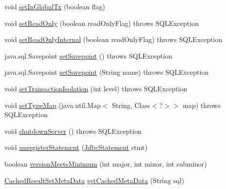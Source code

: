 \begin{DoxyCompactItemize}
\item 
void \mbox{\hyperlink{classcom_1_1mysql_1_1cj_1_1jdbc_1_1_connection_impl_a70a08ce7c0dea524a32a245986fb1531}{set\+In\+Global\+Tx}} (boolean flag)
\item 
void \mbox{\hyperlink{classcom_1_1mysql_1_1cj_1_1jdbc_1_1_connection_impl_a52d1622cdb325e2780cd5f224afc09e0}{set\+Read\+Only}} (boolean read\+Only\+Flag)  throws S\+Q\+L\+Exception 
\item 
void \mbox{\hyperlink{classcom_1_1mysql_1_1cj_1_1jdbc_1_1_connection_impl_a1926df8f86ddb350d61ce032e248a1ba}{set\+Read\+Only\+Internal}} (boolean read\+Only\+Flag)  throws S\+Q\+L\+Exception 
\item 
java.\+sql.\+Savepoint \mbox{\hyperlink{classcom_1_1mysql_1_1cj_1_1jdbc_1_1_connection_impl_af555ecffd63824b2d0ffd566f6aab7cc}{set\+Savepoint}} ()  throws S\+Q\+L\+Exception 
\item 
java.\+sql.\+Savepoint \mbox{\hyperlink{classcom_1_1mysql_1_1cj_1_1jdbc_1_1_connection_impl_ad50f77c6baf0a478c35d52ba98e76e84}{set\+Savepoint}} (String name)  throws S\+Q\+L\+Exception 
\item 
void \mbox{\hyperlink{classcom_1_1mysql_1_1cj_1_1jdbc_1_1_connection_impl_a5555f54beb90978116a2c340a4f11ff3}{set\+Transaction\+Isolation}} (int level)  throws S\+Q\+L\+Exception 
\item 
void \mbox{\hyperlink{classcom_1_1mysql_1_1cj_1_1jdbc_1_1_connection_impl_a8cad56f950d2e2faa07c1d8e46116475}{set\+Type\+Map}} (java.\+util.\+Map$<$ String, Class$<$?$>$$>$ map)  throws S\+Q\+L\+Exception 
\item 
void \mbox{\hyperlink{classcom_1_1mysql_1_1cj_1_1jdbc_1_1_connection_impl_ad33978512e58f5bb84875219ffd8af41}{shutdown\+Server}} ()  throws S\+Q\+L\+Exception 
\item 
void \mbox{\hyperlink{classcom_1_1mysql_1_1cj_1_1jdbc_1_1_connection_impl_a5f86d22252d24d3b0ddf4cb2c7afd4b7}{unregister\+Statement}} (\mbox{\hyperlink{interfacecom_1_1mysql_1_1cj_1_1jdbc_1_1_jdbc_statement}{Jdbc\+Statement}} stmt)
\item 
boolean \mbox{\hyperlink{classcom_1_1mysql_1_1cj_1_1jdbc_1_1_connection_impl_ac05be5f30a9c8aec5773f2b75cd7ab4d}{version\+Meets\+Minimum}} (int major, int minor, int subminor)
\item 
\mbox{\hyperlink{interfacecom_1_1mysql_1_1cj_1_1jdbc_1_1result_1_1_cached_result_set_meta_data}{Cached\+Result\+Set\+Meta\+Data}} \mbox{\hyperlink{classcom_1_1mysql_1_1cj_1_1jdbc_1_1_connection_impl_a8c812f82a9cb453fa511263b0c024362}{get\+Cached\+Meta\+Data}} (String sql)
$$
\end{DoxyCompactItemize}
